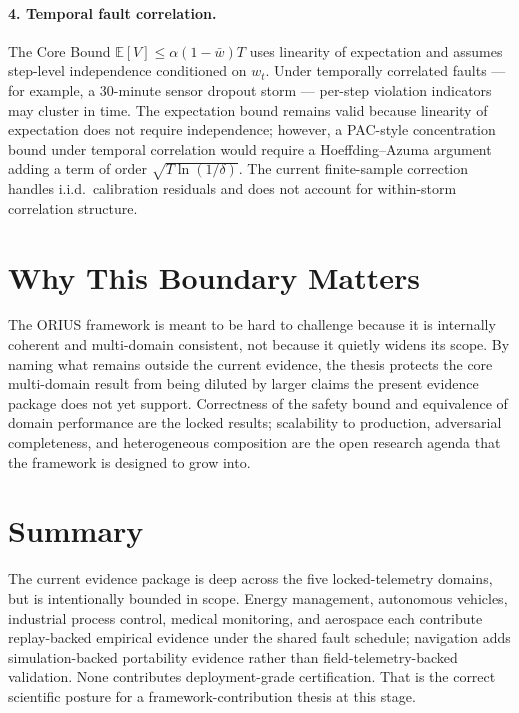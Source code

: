 \paragraph{4. Temporal fault correlation.}
The Core Bound $\mathbb{E}[V] \le \alpha(1-\bar{w})T$ uses linearity of
expectation and assumes step-level independence conditioned on $w_t$.
Under temporally correlated faults --- for example, a 30-minute sensor
dropout storm --- per-step violation indicators may cluster in time.  The
expectation bound remains valid because linearity of expectation does not
require independence; however, a PAC-style concentration bound under
temporal correlation would require a Hoeffding--Azuma argument adding a
term of order $\sqrt{T \ln(1/\delta)}$.  The current finite-sample
correction handles i.i.d.\ calibration residuals and does not account
for within-storm correlation structure.

\section{Why This Boundary Matters}

The ORIUS framework is meant to be hard to challenge because it is internally
coherent and multi-domain consistent, not because it quietly widens its scope.
By naming what remains outside the current evidence, the thesis protects the
core multi-domain result from being diluted by larger claims the present
evidence package does not yet support.  Correctness of the safety bound and
equivalence of domain performance are the locked results; scalability to
production, adversarial completeness, and heterogeneous composition are the
open research agenda that the framework is designed to grow into.

\section{Summary}

The current evidence package is deep across the five locked-telemetry domains,
but is intentionally bounded in scope.  Energy management, autonomous vehicles,
industrial process control, medical monitoring, and aerospace each contribute
replay-backed empirical evidence under the shared fault schedule; navigation
adds simulation-backed portability evidence rather than field-telemetry-backed
validation.  None contributes deployment-grade certification.  That is the
correct scientific posture for a framework-contribution thesis at this stage.
